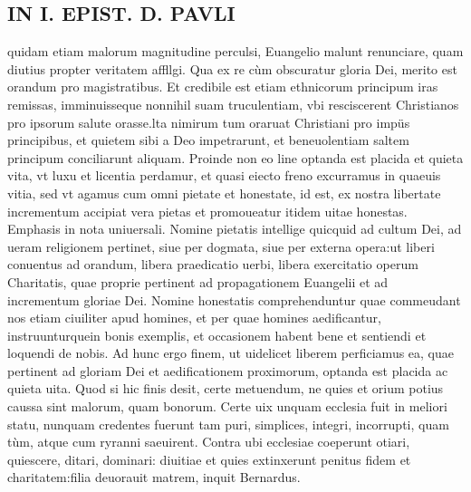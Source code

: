 \documentclass{article}
\begin{document}
\begin{pages}
\section*{IN I. EPIST. D. PAVLI }
\marginpar{[ p.66 ]}\pstart quidam etiam malorum magnitudine perculsi, Euangelio malunt renunciare, quam diutius propter veritatem affllgi. Qua ex re cùm obscuratur gloria Dei, merito est orandum pro magistratibus. Et credibile est etiam ethnicorum principum iras remissas, imminuisseque  nonnihil suam truculentiam, vbi resciscerent Christianos pro ipsorum salute orasse.lta nimirum tum oraruat Christiani pro impüs principibus, et quietem sibi a Deo impetrarunt, et beneuolentiam saltem principum conciliarunt aliquam. Proinde non eo line optanda est placida et quieta vita, vt luxu et licentia perdamur, et quasi eiecto freno excurramus in quaeuis vitia, sed vt agamus cum omni pietate et honestate, id est, ex nostra libertate incrementum accipiat vera pietas et promoueatur itidem uitae honestas. Emphasis in nota uniuersali. Nomine pietatis intellige quicquid ad cultum Dei, ad ueram religionem pertinet, siue per dogmata, siue per externa opera:ut liberi conuentus ad orandum, libera praedicatio uerbi, libera exercitatio operum Charitatis, quae proprie pertinent ad propagationem Euangelii et ad incrementum gloriae Dei. Nomine honestatis comprehenduntur quae commeudant nos etiam ciuiliter apud homines, et per quae homines aedificantur, instruunturquein bonis exemplis, et occasionem habent bene et sentiendi et loquendi de nobis. Ad hunc ergo finem, ut uidelicet liberem perficiamus ea, quae pertinent ad gloriam Dei et aedificationem proximorum, optanda est placida ac quieta uita. Quod si hic finis desit, certe metuendum, ne quies et orium potius caussa sint malorum, quam bonorum. Certe uix unquam ecclesia fuit in meliori statu, nunquam credentes fuerunt tam puri, simplices, integri, incorrupti, quam tùm, atque  cum ryranni saeuirent. Contra ubi ecclesiae coeperunt otiari, quiescere, ditari, dominari: diuitiae et quies extinxerunt penitus fidem et charitatem:filia deuorauit matrem, inquit Bernardus.  \pend
{}
{}

\end{pages}
\end{document}
